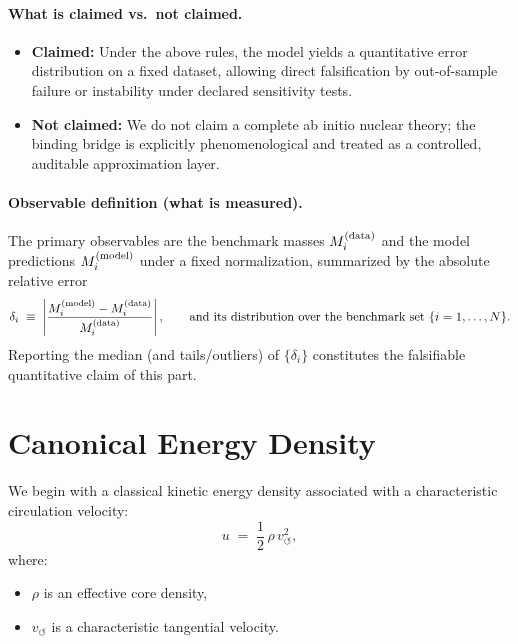 \documentclass[11pt,a4paper]{article}
\begin{document}
\paragraph{What is claimed vs.\ not claimed.}
\begin{itemize}
    \item \textbf{Claimed:} Under the above rules, the model yields a quantitative error distribution on a fixed dataset, allowing direct falsification by out-of-sample failure or instability under declared sensitivity tests.
    \item \textbf{Not claimed:} We do not claim a complete ab initio nuclear theory; the binding bridge is explicitly phenomenological and treated as a controlled, auditable approximation layer.
\end{itemize}

\paragraph{Observable definition (what is measured).}
The primary observables are the benchmark masses $M^{\rm (data)}_i$ and the model predictions $M^{\rm (model)}_i$ under a fixed normalization, summarized by the absolute relative error
\begin{equation}
\delta_i \;\equiv\; \left|\frac{M^{\rm (model)}_i - M^{\rm (data)}_i}{M^{\rm (data)}_i}\right|,
\qquad
\text{and its distribution over the benchmark set } \{i=1,\dots,N\}.
\label{eq:obs_partIII_error}
\end{equation}
Reporting the median (and tails/outliers) of $\{\delta_i\}$ constitutes the falsifiable quantitative claim of this part.

    \section{Canonical Energy Density}

        We begin with a classical kinetic energy density associated with a
        characteristic circulation velocity:
        \begin{equation}
            u \;=\; \frac{1}{2}\,\rho\,v_{\circlearrowleft}^2 ,
            \label{eq:u_def}
        \end{equation}
        where:
        \begin{itemize}
            \item $\rho$ is an effective core density,
            \item $v_{\circlearrowleft}$ is a characteristic tangential velocity.
        \end{itemize}
\end{document}
